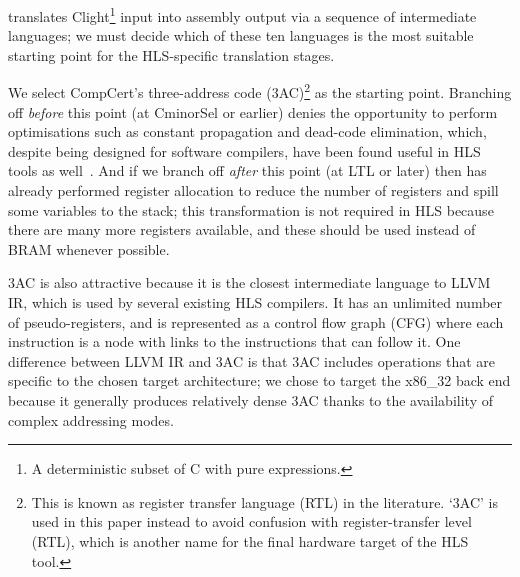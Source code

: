 \def\numcompcertlanguages{ten}

\compcert{} translates Clight\footnote{A deterministic subset of C with pure expressions.} input into assembly output via a sequence of intermediate languages; we must decide which of these \numcompcertlanguages{} languages is the most suitable starting point for the HLS-specific translation stages.

We select CompCert's three-address code (3AC)\footnote{This is known as register transfer language (RTL) in the \compcert{} literature. `3AC' is used in this paper instead to avoid confusion with register-transfer level (RTL), which is another name for the final hardware target of the HLS tool.} as the starting point. Branching off \emph{before} this point (at CminorSel or earlier) denies \compcert{} the opportunity to perform optimisations such as constant propagation and dead-code elimination, which, despite being designed for software compilers, have been found useful in HLS tools as well~\cite{cong+11}. And if we branch off \emph{after} this point (at LTL or later) then \compcert{} has already performed register allocation to reduce the number of registers and spill some variables to the stack; this transformation is not required in HLS because there are many more registers available, and these should be used instead of \gls{BRAM} whenever possible. %

3AC is also attractive because it is the closest intermediate language to LLVM IR, which is used by several existing HLS compilers. %
It has an unlimited number of pseudo-registers, and is represented as a control flow graph (CFG) where each instruction is a node with links to the instructions that can follow it. One difference between LLVM IR and 3AC is that 3AC includes operations that are specific to the chosen target architecture; we chose to target the x86\_32 back end because it generally produces relatively dense 3AC thanks to the availability of complex addressing modes.%

